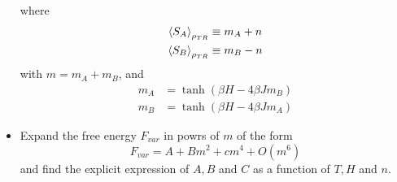 \documentclass[../main/main.tex]{subfiles}
\begin{document}
\begin{exercise}
\begin{itemize}
where
\begin{subequations}
\begin{align}
   \expval{S_A}_{\rho _{TR}}  & \equiv m_A + n \\
    \expval{S_B}_{\rho _{TR}}  & \equiv m_B - n
\end{align}
\end{subequations}
with \( m=m_A+m_B \), and
\begin{subequations}
\begin{align}
   m_A &= \tanh ( \beta H - 4 \beta J m_B) \\
    m_B &= \tanh ( \beta H - 4 \beta J m_A)
\end{align}
\end{subequations}
\item Expand the free energy \( F_{var} \) in powrs of \( m \) of the form
\begin{equation}
  F_{var} = A + B m^2 + c m^4 + O (m^6)
\end{equation}
and find the explicit expression of \( A,B \) and \( C \) as a function of \( T,H \) and \( n \).
\end{itemize}

\end{exercise}
\end{document}
